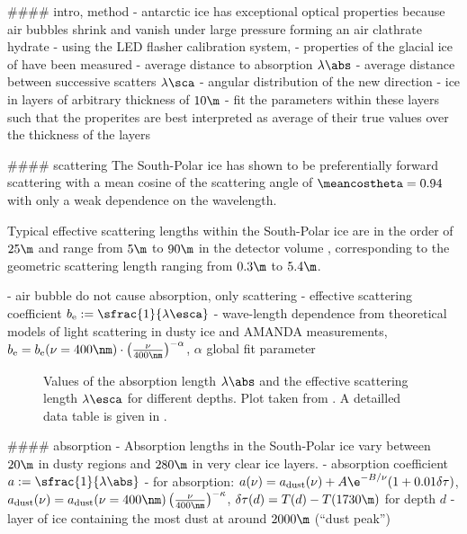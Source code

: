 #### intro, method
- antarctic ice has exceptional optical properties because air bubbles shrink and vanish under large pressure forming an air clathrate hydrate \cite{rongenswedishcamera}
- using the LED flasher calibration system,
- properties of the glacial ice of \icecube have been measured
- average distance to absorption $\lambda\abs$
- average distance between successive scatters $\lambda\sca$
- angular distribution of the new direction \cite{icepaper}
- ice in layers of arbitrary thickness of $10\m$
- fit the parameters within these layers such that the properites are best interpreted as average of their true values over the thickness of the layers \cite{icepaper}


#### scattering
The South-Polar ice has shown to be preferentially forward scattering with a mean cosine of the scattering angle of $\meancostheta = 0.94$ with only a weak dependence on the wavelength. \cite{ackermann}


Typical effective scattering lengths within the South-Polar ice are in the order of $25\m$ \cite{lundberg} and range from $5\m$ to $90\m$ in the detector volume \cite{icepaper}, corresponding to the geometric scattering length ranging from $0.3\m$ to $5.4\m$.

- air bubble do not cause absorption, only scattering \cite{absorption1997}
- effective scattering coefficient $b_\text{e} := \sfrac{1}{\lambda\esca}$
- wave-length dependence from theoretical models of light scattering in dusty ice and AMANDA measurements, $b_\text{e} = b_\text{e}(\nu = 400\nm) \cdot \left(\frac{\nu}{400\nm}\right)^{-\alpha}$, $\alpha$ global fit parameter

\begin{figure}[htbp]
  \hfill
  \caption{Values of the absorption length $\lambda\abs$ and the effective scattering length $\lambda\esca$ for different depths. Plot taken from \cite[figure 16]{icepaper}. A detailled data table is given in \cite[table C1]{icepaper}.}
  \label{fig:Ahxobai3}
\end{figure}

#### absorption
- Absorption lengths in the South-Polar ice vary between $20\m$ in dusty regions and $280\m$ in very clear ice layers. \cite{ackermann, ppcpaper, icepaper}
- absorption coefficient $a := \sfrac{1}{\lambda\abs}$
- for absorption: $a(\nu) = a_\text{dust}(\nu) + A \e^{-B/\nu} (1 + 0.01 \delta\tau)$, $a_\text{dust}(\nu) = a_\text{dust}(\nu = 400\nm) \left(\frac{\nu}{400\nm}\right)^{-\kappa}$, $\delta\tau(d) = T(d) - T(1730\m)$ for depth $d$
- layer of ice containing the most dust at around $2000\m$ (``dust peak'')

